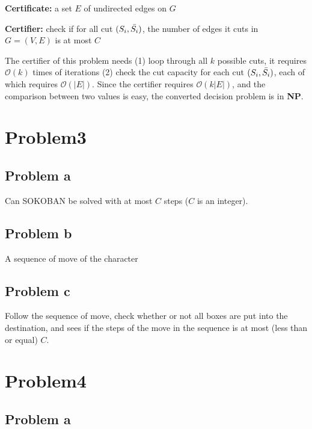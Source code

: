 \documentclass[openany]{article}
\begin{document}
\textbf{Certificate:} a set $E$ of undirected edges on $G$

\textbf{Certifier:} check if for all cut $(S_i,\Bar{S_i})$, the number of edges it cuts in $G=(V,E)$ is at most $C$

The certifier of this problem needs (1) loop through all $k$ possible cuts, it requires $\mathcal{O}(k)$ times of iterations (2) check the cut capacity for each cut $(S_i, \Bar{S_i})$, each of which requires $\mathcal{O}(|E|)$. Since the certifier requires $\mathcal{O}(k|E|)$, and the comparison between two values is easy, the converted decision problem is in \textbf{NP}.

\section*{Problem3}
\subsection*{Problem a}
Can SOKOBAN be solved with at most $C$ steps ($C$ is an integer).

\subsection*{Problem b}
A sequence of move of the character

\subsection*{Problem c}
Follow the sequence of move, check whether or not all boxes are put into the destination, and sees if the steps of the move in the sequence is at most (less than or equal) $C$.


\section*{Problem4}
\subsection*{Problem a}
\end{document}
